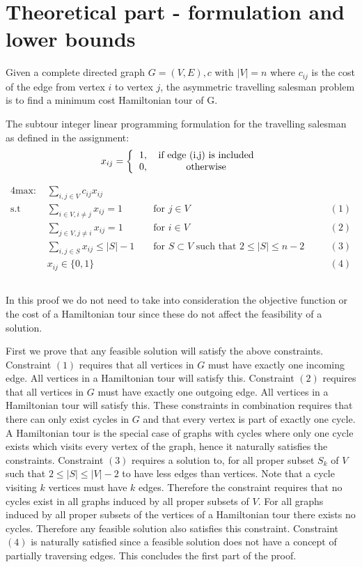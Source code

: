 \section{Theoretical part - formulation and lower bounds}
Given a complete directed graph $G = (V,E),c$ with $|V| = n$ where $c_{ij}$ is the cost of the edge from vertex $i$ to vertex $j$, the asymmetric travelling salesman problem is to find a minimum cost Hamiltonian tour of G.

The subtour integer linear programming formulation for the travelling salesman as defined in the assignment:
\[ 
x_{ij} =
\left \{
  \begin{tabular}{cc}
  1, & if edge (i,j) is included\\
  0, & otherwise 
  \end{tabular}
\right .
\]

\begin{alignat*}{4}
\text{max: }    & \sum_{i,j \in V} c_{ij} x_{ij}\\
\text{s.t }     & \sum_{i \in V, i \neq j} x_{ij} = 1  && \text{ for } j \in V && (1)\\
                & \sum_{j \in V, j \neq i} x_{ij} = 1  && \text{ for } i \in V && (2)\\
                & \sum_{i,j \in S} x_{ij} \leq |S| - 1 && \text{ for } S \subset V \text{ such that } 2 \leq |S| \leq n - 2 \quad && (3)\\
                & x_{ij} \in \{0,1\} && && (4)
\end{alignat*}

\subsection{} %
In this proof we do not need to take into consideration the objective function or the cost of a Hamiltonian tour since these do not affect the feasibility of a solution.

First we prove that any feasible solution will satisfy the above constraints. Constraint $(1)$ requires that all vertices in $G$ must have exactly one incoming edge. All vertices in a Hamiltonian tour will satisfy this. Constraint $(2)$ requires that all vertices in $G$ must have exactly one outgoing edge. All vertices in a Hamiltonian tour will satisfy this. These constraints in combination requires that there can only exist cycles in $G$ and that every vertex is part of exactly one cycle. A Hamiltonian tour is the special case of graphs with cycles where only one cycle exists which visits every vertex of the graph, hence it naturally satisfies the constraints. Constraint $(3)$ requires a solution to, for all proper subset $S_k $ of $V$ such that $2 \leq |S| \leq |V| - 2$ to have less edges than vertices. Note that a cycle visiting $k$ vertices must have $k$ edges. Therefore the constraint requires that no cycles exist in all graphs induced by all proper subsets of $V$. For all graphs induced by all proper subsets of the vertices of a Hamiltonian tour there exists no cycles. Therefore any feasible solution also satisfies this constraint. Constraint $(4)$ is naturally satisfied since a feasible solution does not have a concept of partially traversing edges. This concludes the first part of the proof.


